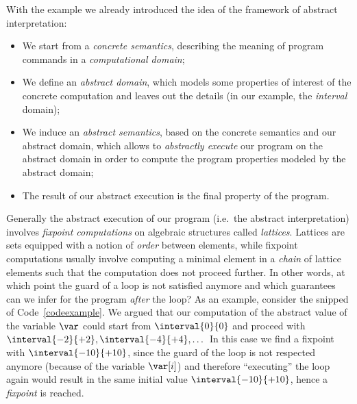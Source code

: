 \medskip

\noindent
With the example we already introduced the idea of the framework of
abstract interpretation:
\begin{itemize}
\item We start from a \emph{concrete semantics}, describing the
  meaning of program commands in a \emph{computational domain};
\item We define an \emph{abstract domain}, which models some
  properties of interest of the concrete computation and leaves out
  the details (in our example, the \emph{interval} domain);
\item We induce an \emph{abstract semantics}, based on the concrete
  semantics and our abstract domain, which allows to \emph{abstractly
    execute} our program on the abstract domain in order to compute
  the program properties modeled by the abstract domain;
\item The result of our abstract execution is the final property of
  the program.
\end{itemize}
Generally the abstract execution of our program (i.e.\ the abstract
interpretation) involves \emph{fixpoint computations} on algebraic
structures called \emph{lattices}. Lattices are sets equipped with a
notion of \emph{order} between elements, while fixpoint computations
usually involve computing a minimal element in a \emph{chain} of
lattice elements such that the computation does not proceed further.
In other words, at which point the guard of a loop is not satisfied
anymore and which guarantees can we infer for the program \emph{after}
the loop? As an example, consider the snipped of
Code~\ref{codeexample}. We argued that our computation of the abstract
value of the variable \(\var\) could start from \(\interval{0}{0}\)
and proceed with \(\interval{-2}{+2}, \interval{-4}{+4}, \dots\) In
this case we find a fixpoint with \(\interval{-10}{+10}\), since the
guard of the loop is not respected anymore (because of the variable
\(\var[i]\)) and therefore ``executing'' the loop again would result
in the same initial value \(\interval{-10}{+10}\), hence a
\emph{fixpoint} is reached.

\medskip

